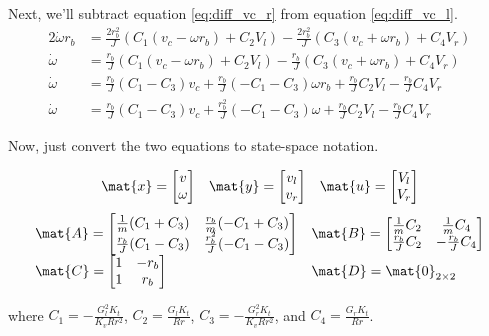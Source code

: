 Next, we'll subtract equation \eqref{eq:diff_vc_r} from equation
\eqref{eq:diff_vc_l}.
\begin{align*}
  2\dot{\omega} r_b &= \frac{2r_b^2}{J}
    \left(C_1(v_c - \omega r_b) + C_2 V_l\right) -
    \frac{2r_b^2}{J} \left(C_3(v_c + \omega r_b) + C_4 V_r\right) \\
  \dot{\omega} &= \frac{r_b}{J} \left(C_1(v_c - \omega r_b) + C_2 V_l\right) -
    \frac{r_b}{J} \left(C_3(v_c + \omega r_b) + C_4 V_r\right) \\
  \dot{\omega} &= \frac{r_b}{J} (C_1 - C_3) v_c +
    \frac{r_b}{J} (-C_1 - C_3) \omega r_b + \frac{r_b}{J} C_2 V_l -
    \frac{r_b}{J} C_4 V_r \\
  \dot{\omega} &= \frac{r_b}{J} (C_1 - C_3) v_c +
    \frac{r_b^2}{J} (-C_1 - C_3) \omega + \frac{r_b}{J} C_2 V_l -
    \frac{r_b}{J} C_4 V_r
\end{align*}

Now, just convert the two equations to state-space notation.
\begin{theorem}
  \label{thm:ramsete_coupled_ref_tracker}
  \begin{equation*}
    \begin{array}{ccc}
      \mat{x} =
      \begin{bmatrix}
        v \\
        \omega
      \end{bmatrix} &
      \mat{y} =
      \begin{bmatrix}
        v_l \\
        v_r
      \end{bmatrix} &
      \mat{u} =
      \begin{bmatrix}
        V_l \\
        V_r
      \end{bmatrix}
    \end{array}
  \end{equation*}
  \begin{equation}
    \begin{array}{ll}
      \mat{A} =
      \begin{bmatrix}
        \frac{1}{m}(C_1 + C_3) & \frac{r_b}{m}(-C_1 + C_3) \\
        \frac{r_b}{J}(C_1 - C_3) & \frac{r_b^2}{J}(-C_1 - C_3)
      \end{bmatrix} &
      \mat{B} =
      \begin{bmatrix}
        \frac{1}{m}C_2 & \frac{1}{m}C_4 \\
        \frac{r_b}{J}C_2 & -\frac{r_b}{J}C_4
      \end{bmatrix} \\
      \mat{C} =
      \begin{bmatrix}
        1 & -r_b \\
        1 & r_b
      \end{bmatrix} &
      \mat{D} = \mat{0}_{2 \times 2}
    \end{array}
  \end{equation}

  where $C_1 = -\frac{G_l^2 K_t}{K_v R r^2}$, $C_2 = \frac{G_l K_t}{Rr}$,
  $C_3 = -\frac{G_r^2 K_t}{K_v R r^2}$, and $C_4 = \frac{G_r K_t}{Rr}$.
\end{theorem}

